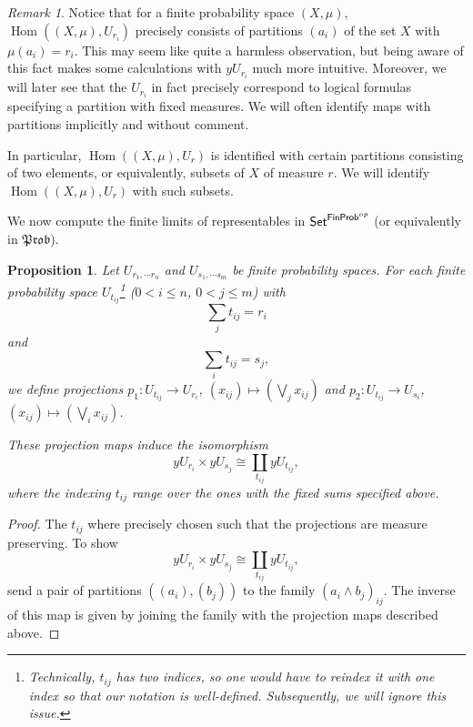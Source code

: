 \documentclass[a4paper]{amsproc}
\theoremstyle{plain}
\newtheorem{proposition}[theorem]{Proposition}
\theoremstyle{definition}
\theoremstyle{remark}
\newtheorem{remark}[theorem]{Remark}
\numberwithin{equation}{section}
\DeclareMathOperator{\Hom}{Hom}
\newcommand{\y}{\textit{y}}
\newcommand{\Set}{\textup{\textsf{Set}}}
\newcommand{\FinProb}{\textup{\textsf{FinProb}}}
\newcommand{\Prob}{\mathfrak{Prob}}
\begin{document}
\begin{remark}\label{classifying_partitions}
    Notice that for a finite probability space $(X,\mu)$, $\Hom((X,\mu), U_{r_i})$ precisely consists of partitions $(a_i)$ of the set $X$ with $\mu(a_i) = r_i$. This may seem like quite a harmless observation, but being aware of this fact makes some calculations with $\y U_{r_i}$ much more intuitive. Moreover, we will later see that the $U_{r_i}$ in fact precisely correspond to logical formulas specifying a partition with fixed measures. We will often identify maps with partitions implicitly and without comment.

    In particular, $\Hom((X,\mu), U_r)$ is identified with certain partitions consisting of two elements, or equivalently, subsets of $X$ of measure $r$. We will identify $\Hom((X,\mu), U_r)$ with such subsets.

\end{remark}

We now compute the finite limits of representables in $\Set^{\FinProb^{op}}$ (or equivalently in $\Prob$).

\begin{proposition} \label{multi-product}
    Let $U_{r_1, \cdots r_n}$ and $U_{s_1, \cdots s_m}$ be finite probability spaces. For each finite probability space $U_{t_{ij}}$\footnote{Technically, $t_{ij}$ has two indices, so one would have to reindex it with one index so that our notation is well-defined. Subsequently, we will ignore this issue.} ($0 < i \leq n$, $0 < j \leq m$) with
    \[
        \sum_j t_{ij} = r_i
    \]
    and
    \[
        \sum_i t_{ij} = s_j ,
    \]
    we define projections $p_1: U_{t_{ij}} \to U_{r_i}$, $(x_{ij}) \mapsto (\bigvee_j x_{ij})$ and $p_2: U_{t_{ij}} \to U_{s_i}$, $(x_{ij}) \mapsto (\bigvee_i x_{ij})$.

    These projection maps induce the isomorphism
    \[
    \y U_{r_i} \times \y U_{s_j} \cong \coprod_{t_{ij}} \y U_{t_{ij}} ,
    \]
    where the indexing $t_{ij}$ range over the ones with the fixed sums specified above.
\end{proposition}
\begin{proof}
    The $t_{ij}$ where precisely chosen such that the projections are measure preserving. To show
    \[
    \y U_{r_i} \times \y U_{s_j} \cong \coprod_{t_{ij}} \y U_{t_{ij}} ,
    \]
    send a pair of partitions $((a_i),(b_j))$ to the family $(a_i \wedge b_j)_{ij}$. The inverse of this map is given by joining the family with the projection maps described above.
\end{proof}
\end{document}
